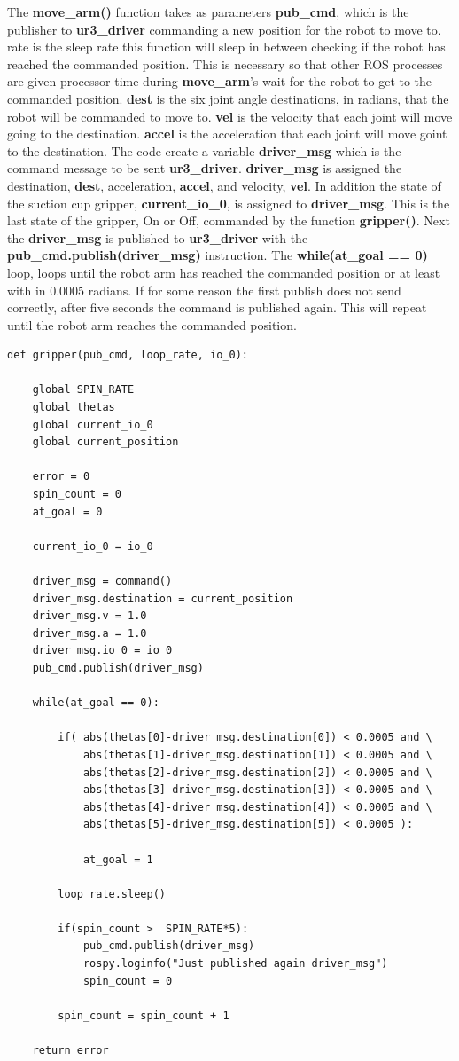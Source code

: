 The \textbf{move\_arm()} function takes as parameters \textbf{pub\_cmd}, which is the publisher to \textbf{ur3\_driver} commanding a new position for the robot to move
to.  rate is the sleep rate this function will sleep in between checking if the robot has reached the commanded position.  This is necessary 
so that other ROS processes are given processor time during \textbf{move\_arm}'s wait for the robot to get to the commanded position.  \textbf{dest} is the six 
joint angle destinations, in radians, that the robot will be commanded to move to.  \textbf{vel} is the velocity that each joint will move going to
the destination.  \textbf{accel} is the acceleration that each joint will move goint to the destination.  
The code create a variable \textbf{driver\_msg} which is the command message to be sent \textbf{ur3\_driver}.  \textbf{driver\_msg} is assigned the destination, \textbf{dest},
acceleration, \textbf{accel}, and velocity, \textbf{vel}.  In addition the state of the suction cup gripper, \textbf{current\_io\_0}, is assigned to \textbf{driver\_msg}.  This is the
last state of the gripper, On or Off, commanded by the function \textbf{gripper()}.  Next the \textbf{driver\_msg} is published to \textbf{ur3\_driver} with the 
\textbf{pub\_cmd.publish(driver\_msg)} instruction.  The \textbf{while(at\_goal == 0)} loop, loops until the robot arm has reached the commanded position or
at least with in 0.0005 radians. If for some reason 
the first publish does not send correctly, after five seconds the command is published again.  This will repeat until the robot arm reaches
the commanded position.   

{\footnotesize
\begin{verbatim}
def gripper(pub_cmd, loop_rate, io_0):

    global SPIN_RATE
    global thetas
    global current_io_0
    global current_position

    error = 0
    spin_count = 0
    at_goal = 0

    current_io_0 = io_0

    driver_msg = command()
    driver_msg.destination = current_position
    driver_msg.v = 1.0
    driver_msg.a = 1.0
    driver_msg.io_0 = io_0   
    pub_cmd.publish(driver_msg)

    while(at_goal == 0):

        if( abs(thetas[0]-driver_msg.destination[0]) < 0.0005 and \
            abs(thetas[1]-driver_msg.destination[1]) < 0.0005 and \
            abs(thetas[2]-driver_msg.destination[2]) < 0.0005 and \
            abs(thetas[3]-driver_msg.destination[3]) < 0.0005 and \
            abs(thetas[4]-driver_msg.destination[4]) < 0.0005 and \
            abs(thetas[5]-driver_msg.destination[5]) < 0.0005 ):

            at_goal = 1
		
        loop_rate.sleep()

        if(spin_count >  SPIN_RATE*5):
            pub_cmd.publish(driver_msg)
            rospy.loginfo("Just published again driver_msg")
            spin_count = 0

        spin_count = spin_count + 1

    return error
\end{verbatim}}

